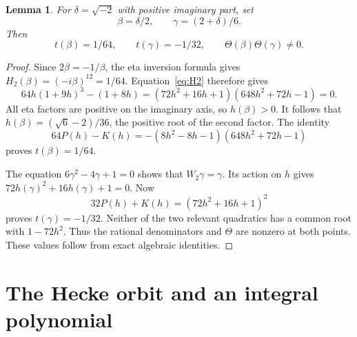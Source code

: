 \documentclass[11pt,a4paper]{article}
\newtheorem{lemma}[theorem]{Lemma}
\theoremstyle{remark}
\begin{document}
\begin{lemma}\label{lem:CM-values}
For $\delta=\sqrt{-2}$ with positive imaginary part, set
\begin{equation}\label{eq:CM-points}
 \beta=\delta/2,\qquad\gamma=(2+\delta)/6.
\end{equation}
Then
\begin{equation}\label{eq:CM-values}
 t(\beta)=1/64,\qquad t(\gamma)=-1/32,
 \qquad \Theta(\beta)\Theta(\gamma)\ne0.
\end{equation}
\end{lemma}
\begin{proof}
Since $2\beta=-1/\beta$, the eta inversion formula
\cite[Section~23.18]{dlmf} gives
$H_2(\beta)=(-i\beta)^{12}=1/64$.
Equation~\eqref{eq:H2} therefore gives
\[
 64h(1+9h)^3-(1+8h)
 =(72h^2+16h+1)(648h^2+72h-1)=0.
\]
All eta factors are positive on the imaginary axis, so $h(\beta)>0$.
It follows that
$h(\beta)=(\sqrt6-2)/36$, the positive root of the second factor.
The identity
\[
 64P(h)-K(h)=-(8h^2-8h-1)(648h^2+72h-1)
\]
proves $t(\beta)=1/64$.

The equation $6\gamma^2-4\gamma+1=0$ shows that $W_2\gamma=\gamma$.
Its action on $h$ gives $72h(\gamma)^2+16h(\gamma)+1=0$.
Now
\[
 32P(h)+K(h)=(72h^2+16h+1)^2
\]
proves $t(\gamma)=-1/32$.
Neither of the two relevant quadratics has a common root with
$1-72h^2$. Thus the rational denominators and $\Theta$ are nonzero
at both points. These values follow from exact algebraic identities.
\end{proof}

\section{The Hecke orbit and an integral polynomial}\label{sec:Hecke}
\end{document}
